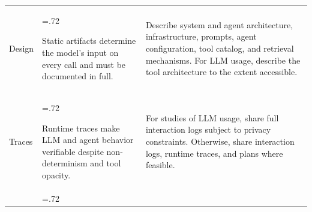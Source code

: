 \documentclass[smallextended]{svjour3}
\newcommand{\must}{\textbf{must}\xspace}
\newcommand{\mustnot}{\textbf{must not}\xspace}
\newcommand{\should}{\textbf{should}\xspace}
\newcommand{\iconM}{\usebox{\iconMbox}\xspace}
\newcommand{\iconS}{\usebox{\iconSbox}\xspace}
\newcommand{\iconM}{●\xspace}
\newcommand{\iconS}{○\xspace}
\newcommand{\llmusage}{\hyperref[sec:studying-llm-usage-in-software-engineering]{\mbox{\emph{Studying LLM Usage}}}\xspace}
\newcommand{\llmusage}{\href{/study-types/usage/}{\emph{Studying LLM Usage}}\xspace}
\begin{document}
\begin{appendices}
\begin{center}
\begin{tabularx}{\textwidth}{@{}>{\raggedright\arraybackslash}p{2.05cm}>{\hsize=.72\hsize\raggedright\arraybackslash}X>{\hsize=1.28\hsize\raggedright\arraybackslash}X@{}}
Design & Static artifacts determine the model's input on every call and must be documented in full. &
\iconM Describe system and agent architecture, infrastructure, prompts, agent configuration, tool catalog, and retrieval mechanisms.
\newline \iconS For LLM usage, describe the tool architecture to the extent accessible. \\
\addlinespace
Traces & Runtime traces make LLM and agent behavior verifiable despite non-determinism and tool opacity. &
\iconM For studies of LLM usage, share full interaction logs subject to privacy constraints.
\newline \iconS Otherwise, share interaction logs, runtime traces, and plans where feasible. \\
\addlinespace

\end{tabularx}
\end{center}
\end{appendices}
\end{document}
